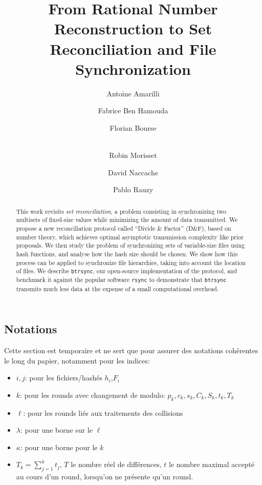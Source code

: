 \documentclass[11pt]{llncs}
\newcommand{\df}{D\&F\xspace}
\newcommand{\btrsync}{\texttt{btrsync}\xspace}
\newcommand{\rsync}{\texttt{rsync}\xspace}
\begin{document}
\title{From Rational Number Reconstruction to Set Reconciliation and File
Synchronization}

\author{Antoine Amarilli \and Fabrice Ben Hamouda \and Florian Bourse \and\\
Robin Morisset \and David Naccache \and Pablo Rauzy}


\maketitle

\begin{abstract}
  This work revisits \textit{set reconciliation}, a problem consisting in synchronizing two multisets of fixed-size values while minimizing the amount of data transmitted. We propose a new reconciliation protocol called ``Divide \& Factor'' (\df), based on number theory, which achieves optimal asymptotic transmission complexity like prior proposals. We then study the problem of synchronizing sets of variable-size files using hash functions, and analyse how the hash size should be chosen. We show how this process can be applied to synchronize file hierarchies, taking into account the location of files. We describe \btrsync, our open-source implementation of the protocol, and benchmark it against the popular software \rsync to demonstrate that \btrsync transmits much less data at the expense of a small computational overhead.
\end{abstract}

\subsection*{Notations}

Cette section est temporaire et ne sert que pour assurer des notations cohérentes le long du papier, notamment pour les indices:
\begin{itemize}
\item $i,j$: pour les fichiers/hashés $h_i$,$F_i$
\item $k$: pour les rounds avec changement de modulo: $p_k,c_k,s_k,C_k,S_k,t_k,T_k$
\item $\ell$: pour les rounds liés aux traitements des collisions
\item $\lambda$: pour une borne sur le $\ell$
\item $\kappa$: pour une borne pour le $k$
\item $T_k = \sum_{j=1}^k t_j$, $T$ le nombre réel de différences, $t$ le nombre
  maximal accepté au cours d'un round, lorsqu'on ne présente qu'un round.
\end{itemize}
\end{document}
